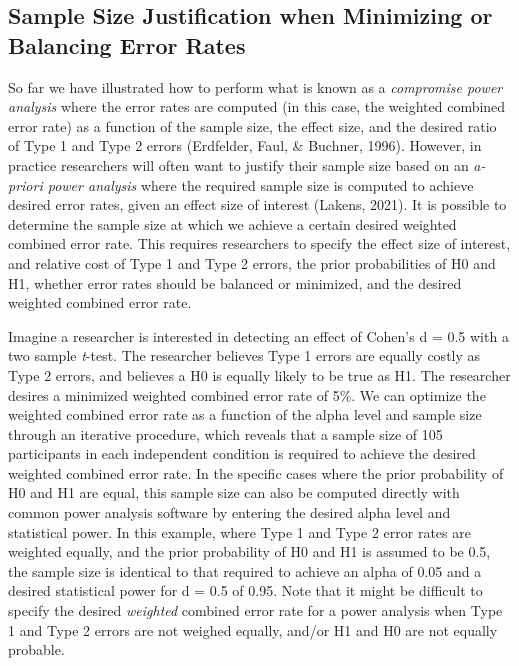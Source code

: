 \documentclass[
  english,
  ,jou, a4paper,floatsintext]{apa6}
\begin{document}
\hypertarget{sample-size-justification-when-minimizing-or-balancing-error-rates}{%
\subsection{Sample Size Justification when Minimizing or Balancing Error Rates}\label{sample-size-justification-when-minimizing-or-balancing-error-rates}}

So far we have illustrated how to perform what is known as a \emph{compromise power analysis} where the error rates are computed (in this case, the weighted combined error rate) as a function of the sample size, the effect size, and the desired ratio of Type 1 and Type 2 errors (Erdfelder, Faul, \& Buchner, 1996). However, in practice researchers will often want to justify their sample size based on an \emph{a-priori power analysis} where the required sample size is computed to achieve desired error rates, given an effect size of interest (Lakens, 2021). It is possible to determine the sample size at which we achieve a certain desired weighted combined error rate. This requires researchers to specify the effect size of interest, and relative cost of Type 1 and Type 2 errors, the prior probabilities of H0 and H1, whether error rates should be balanced or minimized, and the desired weighted combined error rate.

Imagine a researcher is interested in detecting an effect of Cohen's d = 0.5 with a two sample \emph{t}-test. The researcher believes Type 1 errors are equally costly as Type 2 errors, and believes a H0 is equally likely to be true as H1. The researcher desires a minimized weighted combined error rate of 5\%. We can optimize the weighted combined error rate as a function of the alpha level and sample size through an iterative procedure, which reveals that a sample size of 105 participants in each independent condition is required to achieve the desired weighted combined error rate. In the specific cases where the prior probability of H0 and H1 are equal, this sample size can also be computed directly with common power analysis software by entering the desired alpha level and statistical power. In this example, where Type 1 and Type 2 error rates are weighted equally, and the prior probability of H0 and H1 is assumed to be 0.5, the sample size is identical to that required to achieve an alpha of 0.05 and a desired statistical power for d = 0.5 of 0.95. Note that it might be difficult to specify the desired \emph{weighted} combined error rate for a power analysis when Type 1 and Type 2 errors are not weighed equally, and/or H1 and H0 are not equally probable.
\end{document}
